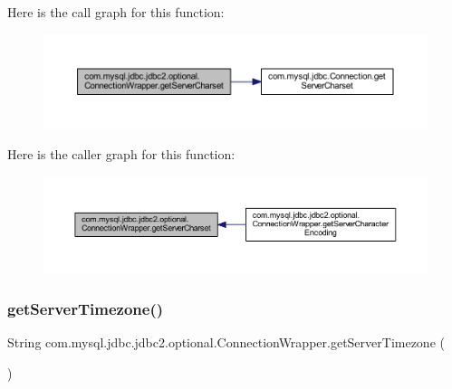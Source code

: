 Here is the call graph for this function\+:
\nopagebreak
\begin{figure}[H]
\begin{center}
\leavevmode
\includegraphics[width=350pt]{classcom_1_1mysql_1_1jdbc_1_1jdbc2_1_1optional_1_1_connection_wrapper_a1ef2f18c2e33a44c97b764a50fda2da4_cgraph}
\end{center}
\end{figure}
Here is the caller graph for this function\+:
\nopagebreak
\begin{figure}[H]
\begin{center}
\leavevmode
\includegraphics[width=350pt]{classcom_1_1mysql_1_1jdbc_1_1jdbc2_1_1optional_1_1_connection_wrapper_a1ef2f18c2e33a44c97b764a50fda2da4_icgraph}
\end{center}
\end{figure}
\mbox{\label{classcom_1_1mysql_1_1jdbc_1_1jdbc2_1_1optional_1_1_connection_wrapper_a170059c98c792a038932db8bb5b0bd2b}} 
\subsubsection{\texorpdfstring{get\+Server\+Timezone()}{getServerTimezone()}}
{\footnotesize\ttfamily String com.\+mysql.\+jdbc.\+jdbc2.\+optional.\+Connection\+Wrapper.\+get\+Server\+Timezone (\begin{DoxyParamCaption}{ }\end{DoxyParamCaption})}

